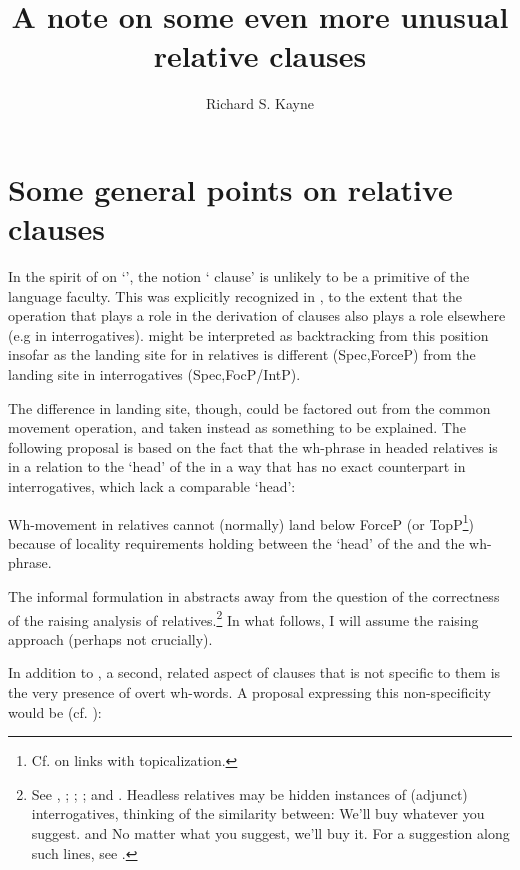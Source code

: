 \documentclass[output=paper]{LSP/langsci}
\author{Richard S. Kayne\affiliation{New York University}}
\title{A note on some even more unusual relative clauses}
\begin{document}
 
\section{Some general points on relative clauses}

     In the spirit of \citet{Chomsky1970} on ‘’, the notion ‘ clause’ is unlikely to be a primitive of the language faculty.  This was explicitly recognized in \citet{Chomsky1977}, to the extent that the  operation that plays a role in the derivation of  clauses also plays a role elsewhere (e.g in interrogatives).  \citet{Rizzi1997} might be interpreted as backtracking from this position insofar as the landing site for  in relatives is different (Spec,ForceP) from the landing site in interrogatives (Spec,FocP/IntP).

     The difference in landing site, though, could be factored out from the common movement operation, and taken instead as something to be explained.  The following proposal is based on the fact that the wh-phrase in headed relatives is in a relation to the ‘head’ of the  in a way that has no exact counterpart in interrogatives, which lack a comparable ‘head’:

\ea\label{ex:kayne:1}
   Wh-movement in relatives cannot (normally) land below ForceP (or TopP\footnote{Cf. \citet{Cinque1982} on links with topicalization.}) because of locality requirements holding between the ‘head’ of the  and the wh-phrase.
\z

     The informal formulation in  abstracts away from the {question} of the correctness of the raising analysis of relatives.\footnote{See \citealt[125]{Brame1976}, \citealt{Schachter1973,Vergnaud1974,Vergnaud1985}; \citealt[chap. 9]{Kayne1994}; \citealt{Bianchi1999};  and \citealt{KatoNunes2009}.
     Headless relatives may be hidden instances of (adjunct) interrogatives, thinking of the similarity between:
\ea     We’ll buy whatever you suggest.\z
and
\ea  No matter what you suggest, we’ll buy it.
\z
For a suggestion along such lines, see \citet{Lin1996}.} 
 In what follows, I will assume the raising approach (perhaps not crucially).

     In addition to , a second, related aspect of  clauses that is not specific to them is the very presence of overt wh-words.  A proposal expressing this non-specificity would be (cf. \citealt{Postma1994}):
\end{document}
